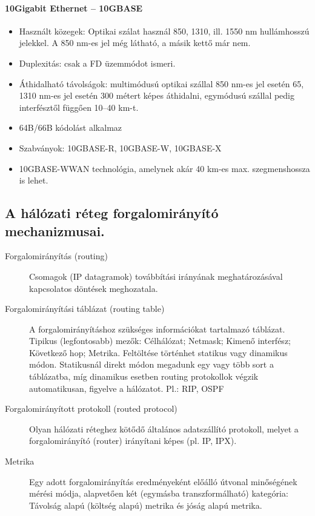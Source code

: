 \paragraph{10Gigabit Ethernet -- 10GBASE}
\begin{itemize}[nosep]
	\item Használt közegek: Optikai szálat használ 850, 1310, ill. 1550 nm hullámhosszú jelekkel. A 850 nm-es jel még látható, a másik kettő már nem.
	\item Duplexitás: csak a FD üzemmódot ismeri.
	\item Áthidalható távolságok: multimódusú optikai szállal 850 nm-es jel esetén 65, 1310 nm-es jel esetén 300 métert képes áthidalni, egymódusú szállal pedig interfésztől függően 10–40 km-t.
	\item 64B/66B kódolást alkalmaz
	\item Szabványok: 10GBASE-R, 10GBASE-W, 10GBASE-X
	\item 10GBASE-W\quad WAN technológia, amelynek akár 40 km-es max. szegmenshossza is lehet.
\end{itemize}

\subsection{A hálózati réteg forgalomirányító mechanizmusai. }
\begin{description}
	\item[Forgalomirányítás (routing)] Csomagok (IP datagramok) továbbítási irányának meghatározásával kapcsolatos döntések meghozatala.

	\item[Forgalomirányítási táblázat (routing table)] A forgalomirányításhoz szükséges információkat tartalmazó táblázat. Tipikus (legfontosabb) mezők: Célhálózat; Netmask; Kimenő interfész; Következő hop; Metrika. Feltöltése történhet statikus vagy dinamikus módon. Statikusnál direkt módon megadunk egy vagy több sort a táblázatba, míg dinamikus esetben routing protokollok végzik automatikusan, figyelve a hálózatot. Pl.: RIP, OSPF

	\item[Forgalomirányított protokoll (routed protocol)] Olyan hálózati réteghez kötődő általános adatszállító protokoll, melyet a forgalomirányító (router) irányítani képes (pl. IP, IPX).

	\item[Metrika] Egy adott forgalomirányítás eredményeként előálló útvonal minőségének mérési módja, alapvetően két (egymásba transzformálható) kategória: Távolság alapú (költség alapú) metrika és jóság alapú metrika.
\end{description}

